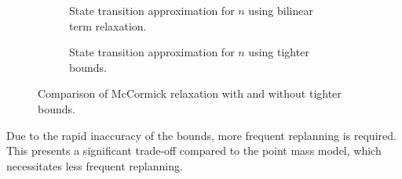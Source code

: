\begin{figure}[h]
	\centering
	\begin{subfigure}[b]{0.45\textwidth}
		\centering
		\resizebox{\textwidth}{!}{}
		\caption{State transition approximation for \( n \) using bilinear term relaxation.}
		\label{fig:mccormick_problem}
	\end{subfigure}
	\hfill
	\begin{subfigure}[b]{0.45\textwidth}
		\centering
		\resizebox{\textwidth}{!}{}
		\caption{State transition approximation for \( n \) using tighter bounds.}
		\label{fig:mccormick_problem_better}
	\end{subfigure}
	\caption{Comparison of McCormick relaxation with and without tighter bounds.}
\end{figure}
Due to the rapid inaccuracy of the bounds, more frequent replanning is required.
This presents a significant trade-off compared to the point mass model, which necessitates less frequent replanning.
